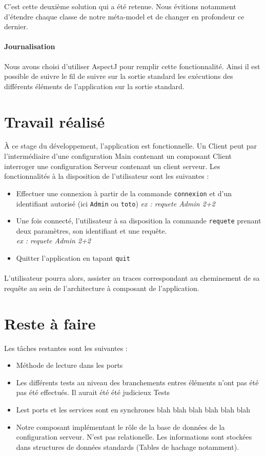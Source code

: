 \documentclass[12pt]{article}
\begin{document}
C'est cette deuxième solution qui a été retenue. Nous évitions notamment d'étendre chaque classe de notre méta-model et de changer en profondeur ce dernier.

\paragraph{Journalisation}
Nous avons choisi d'utiliser AspectJ pour remplir cette fonctionnalité.  Ainsi il est possible de suivre le fil de suivre sur la sortie standard les exécutions des différents éléments de l'application sur la sortie standard. 

\section{Travail réalisé}
À ce stage du développement, l'application est fonctionnelle. Un Client peut par l'intermédiaire d'une configuration \og Main \fg{} contenant un composant Client interroger une configuration Serveur contenant un client serveur. Les fonctionnalités à la disposition de l'utilisateur sont les suivantes :
\begin{itemize}
\item
  Effectuer une connexion à partir de la commande \verb+connexion+ et d'un identifiant autorisé (ici \verb+Admin+ ou \verb+toto+)
  \emph{ex : requete Admin 2+2}
\item
  Une fois connecté, l'utilisateur à sa disposition la commande \verb+requete+ prenant deux paramètres, son identifiant et une requête.  \hfill \\ 
  \emph{ex : requete Admin 2+2}
\item
  Quitter l'application en tapant \verb+quit+
\end{itemize}
\paragraph{}

L'utilisateur pourra alors, assister au traces correspondant au cheminement de sa requête au sein de l'architecture à composant de l'application.


\section{Reste à faire}
Les tâches restantes sont les suivantes : 

\begin{itemize}
\item
  Méthode de lecture dans les ports
\item
  Les différents tests au niveau des branchements entres éléments n'ont pas été pas été effectués.   
  Il aurait été été judicieux Tests

\item
  Lest ports et les services sont en synchrones blah blah blah  blah blah blah 
\item
  Notre composant implémentant le rôle de la base de données de la configuration serveur. N'est pas relationelle. Les informations sont stockées dans structures de données standards (Tables de hachage notamment).
  
  
\end{itemize}
\end{document}
